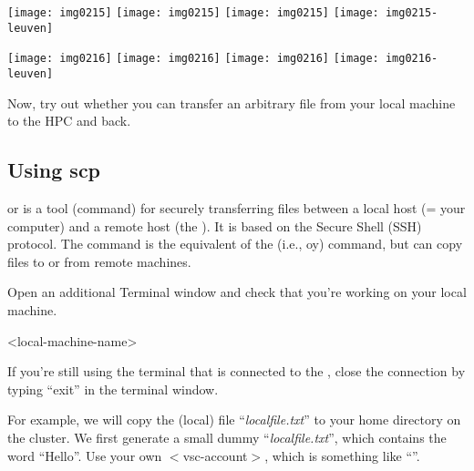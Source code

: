   \begin{center}
\ifantwerpen
  \texttt{[image: img0215]}
\fi
\ifbrussel
  \texttt{[image: img0215]}
\fi
\ifgent
  \texttt{[image: img0215]}
\fi
\ifleuven
  \texttt{[image: img0215-leuven]}
\fi
  \end{center}
  \firsttimeconnection

  \begin{center}
\ifantwerpen
  \texttt{[image: img0216]}
\fi
\ifbrussel
  \texttt{[image: img0216]}
\fi
\ifgent
  \texttt{[image: img0216]}
\fi
\ifleuven
  \texttt{[image: img0216-leuven]}
\fi
  \end{center}

  Now, try out whether you can transfer an arbitrary file from your local
  machine to the HPC and back.

\fi

\ifmacORlinux
  \subsection{Using scp}

   or  is a tool (command) for securely
  transferring files between a local host (= your computer) and a remote host
  (the \hpc). It is based on the Secure Shell (SSH) protocol.  The 
  command is the equivalent of the   (i.e., oy)
  command, but can copy files to or from remote machines.

  Open an additional Terminal window and check that you're working on your local
  machine.

\begin{prompt}
<local-machine-name>
\end{prompt}

  If you're still using the terminal that is connected to the \hpc, close the
  connection by typing ``exit'' in the terminal window.

  For example, we will copy the (local) file ``\emph{localfile.txt}'' to your
  home directory on the \hpc cluster. We first generate a small dummy
  ``\emph{localfile.txt}'', which contains the word ``Hello''.  Use your own
  $<$vsc-account$>$, which is something like ``\emph{\userid}''.

